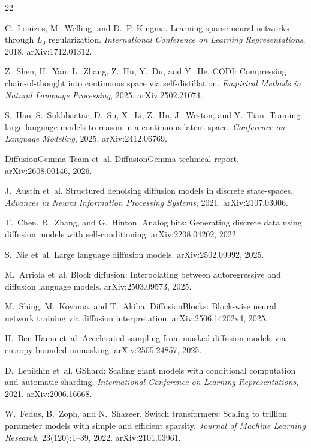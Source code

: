 \documentclass[10pt,a4paper]{article}
\begin{document}
\begin{thebibliography}{22}
\footnotesize
\setlength{\itemsep}{0.15em}

C.~Louizos, M.~Welling, and D.~P. Kingma.
Learning sparse neural networks through $L_0$ regularization.
\emph{International Conference on Learning Representations}, 2018.
arXiv:1712.01312.

Z.~Shen, H.~Yan, L.~Zhang, Z.~Hu, Y.~Du, and Y.~He.
CODI: Compressing chain-of-thought into continuous space via self-distillation.
\emph{Empirical Methods in Natural Language Processing}, 2025.
arXiv:2502.21074.

S.~Hao, S.~Sukhbaatar, D.~Su, X.~Li, Z.~Hu, J.~Weston, and Y.~Tian.
Training large language models to reason in a continuous latent space.
\emph{Conference on Language Modeling}, 2025.
arXiv:2412.06769.

DiffusionGemma Team et~al.
DiffusionGemma technical report.
arXiv:2608.00146, 2026.

J.~Austin et~al.
Structured denoising diffusion models in discrete state-spaces.
\emph{Advances in Neural Information Processing Systems}, 2021.
arXiv:2107.03006.

T.~Chen, R.~Zhang, and G.~Hinton.
Analog bits: Generating discrete data using diffusion models with
self-conditioning.
arXiv:2208.04202, 2022.

S.~Nie et~al.
Large language diffusion models.
arXiv:2502.09992, 2025.

M.~Arriola et~al.
Block diffusion: Interpolating between autoregressive and diffusion language
models.
arXiv:2503.09573, 2025.

M.~Shing, M.~Koyama, and T.~Akiba.
DiffusionBlocks: Block-wise neural network training via diffusion
interpretation.
arXiv:2506.14202v4, 2025.

H.~Ben-Hamu et~al.
Accelerated sampling from masked diffusion models via entropy bounded
unmasking.
arXiv:2505.24857, 2025.

D.~Lepikhin et~al.
GShard: Scaling giant models with conditional computation and automatic
sharding.
\emph{International Conference on Learning Representations}, 2021.
arXiv:2006.16668.

W.~Fedus, B.~Zoph, and N.~Shazeer.
Switch transformers: Scaling to trillion parameter models with simple and
efficient sparsity.
\emph{Journal of Machine Learning Research}, 23(120):1--39, 2022.
arXiv:2101.03961.


\end{thebibliography}
\end{document}
